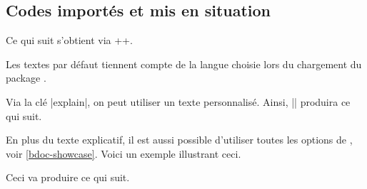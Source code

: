 \documentclass[10pt, a4paper]{article}
\begin{document}


\subsection{Codes importés et mis en situation} \label{bdoc-latexshow}

\begin{bdocexa}[Showcase]
    Ce qui suit s'obtient via \bdocinlatex++.

    \medskip

    \begin{bdoc-doc-showcase}
    \end{bdoc-doc-showcase}
\end{bdocexa}


\begin{bdocnote}
    Les textes par défaut tiennent compte de la langue choisie lors du chargement du package .
\end{bdocnote}




\begin{bdocexa}
    Via la clé \bdocinlatex|explain|, on peut utiliser un texte personnalisé. Ainsi, \bdocinlatex|| produira ce qui suit.

    \medskip

    \begin{bdoc-doc-showcase}
    \end{bdoc-doc-showcase}
\end{bdocexa}




\begin{bdocexa}
    En plus du texte explicatif, il est aussi possible d'utiliser toutes les options de , voir \ref{bdoc-showcase}.
    Voici un exemple illustrant ceci.

    \medskip


    \medskip

    Ceci va produire ce qui suit.

    \medskip

    \begin{bdoc-doc-showcase}
        
    \end{bdoc-doc-showcase}
\end{bdocexa}
\end{document}
